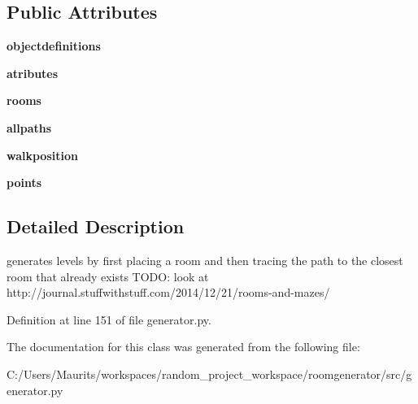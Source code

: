 \subsection*{Public Attributes}
\begin{DoxyCompactItemize}
\item 
\hypertarget{classgenerator_1_1_generator_afb2be969746affe10eca5f51175ba5cc}{}{\bfseries objectdefinitions}\label{classgenerator_1_1_generator_afb2be969746affe10eca5f51175ba5cc}

\item 
\hypertarget{classgenerator_1_1_generator_ad876a608d3338bb30ddd568068f7ae09}{}{\bfseries atributes}\label{classgenerator_1_1_generator_ad876a608d3338bb30ddd568068f7ae09}

\item 
\hypertarget{classgenerator_1_1_generator_a76f57926a6aaf1e1e3a0128a49570eb6}{}{\bfseries rooms}\label{classgenerator_1_1_generator_a76f57926a6aaf1e1e3a0128a49570eb6}

\item 
\hypertarget{classgenerator_1_1_generator_a02e381d11e2d1a91ab01486757a2cc84}{}{\bfseries allpaths}\label{classgenerator_1_1_generator_a02e381d11e2d1a91ab01486757a2cc84}

\item 
\hypertarget{classgenerator_1_1_generator_a3fb786f436b237dbe02e3794155808ce}{}{\bfseries walkposition}\label{classgenerator_1_1_generator_a3fb786f436b237dbe02e3794155808ce}

\item 
\hypertarget{classgenerator_1_1_generator_a16621c01ad7f3857f398f5e2c8f29085}{}{\bfseries points}\label{classgenerator_1_1_generator_a16621c01ad7f3857f398f5e2c8f29085}

\end{DoxyCompactItemize}


\subsection{Detailed Description}
\begin{DoxyVerb}generates levels by first placing a room and then tracing the path to the closest room that already exists
TODO: look at http://journal.stuffwithstuff.com/2014/12/21/rooms-and-mazes/
\end{DoxyVerb}
 

Definition at line 151 of file generator.\+py.



The documentation for this class was generated from the following file\+:\begin{DoxyCompactItemize}
\item 
C\+:/\+Users/\+Maurits/workspaces/random\+\_\+project\+\_\+workspace/roomgenerator/src/generator.\+py\end{DoxyCompactItemize}

